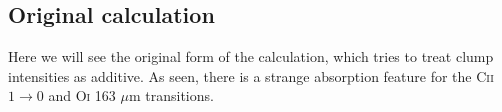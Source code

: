 \documentclass[a4paper]{article}
\begin{document}
%
%
%
%
%
%
%
%
%
%
%
%
%
%
    \newpage

    \subsection{Original calculation} \label{original calc}
    Here we will see the original form of the calculation, which tries to treat clump intensities as additive. As seen, there is a strange absorption feature for the C\textsc{ii} \(1 \rightarrow 0\) and O\textsc{i} 163 \(\mu\)m transitions.
\end{document}
